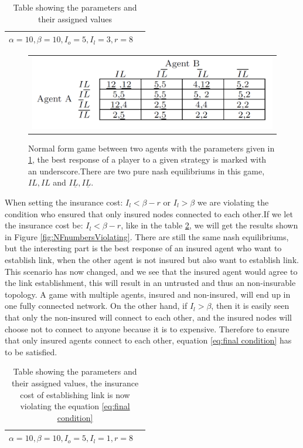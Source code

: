 \begin{table}[h]
\centering
\begin{tabular}{lc}
 \hline
  $\alpha=10,
  \beta=10,
  I_{o}=5,
  I_{l}=3,
  r=8$\\
  \hline
\end{tabular}
\caption{Table showing the parameters and their assigned values \label{tbl:simplegamevalue}}
\end{table}

\begin{figure}[h]
\centering
\begin{tabular}{@{}c@{}}
\includegraphics[width=1.0\textwidth]{../Figures/gameTheoryModel1WithNumbers.png}
\end{tabular}
\caption[Caption for LOF]{Normal form game between two agents with the parameters given in \ref{tbl:simplegamevalue}, the best response of a player to a given strategy is marked with an underscore.There are two pure nash equilibriums in this game,$IL,IL$ and $I\underline{L},I\underline{L}$. \label{fig:NFnumbers}}
\end{figure}
When setting the insurance cost: $I_{l}<\beta - r$ or $I_{l}>\beta$ we are violating the condition who ensured that only insured nodes connected to each other.If we let the insurance cost be: $I_{l}<\beta - r$, like in the table \ref{tbl:simplegamevalue2}, we will get the results shown in Figure \ref{fig:NFnumbersViolating}. There are still the same nash equilibriums, but the interesting part is the best response of an insured agent who want to establish link, when the other agent is not insured but also want to establish link. This scenario has now changed, and we see that the insured agent would agree to the link establishment, this will result in an untrusted and thus an non-insurable topology. A game with multiple agents, insured and non-insured, will end up in one fully connected network.
On the other hand, if $I_{l}>\beta$, then it is easily seen that only the non-insured will connect to each other, and the insured nodes will choose not to connect to anyone because it is to expensive.
 Therefore to ensure that only insured agents connect to each other, equation \ref{eq:final condition} has to be satisfied. 
\begin{table}[h]
\centering
\begin{tabular}{lc}
 \hline
  $\alpha=10,
  \beta=10,
  I_{o}=5,
  I_{l}=1,
  r=8$\\
  \hline
\end{tabular}
\caption{Table showing the parameters and their assigned values, the insurance cost of establishing link is now violating the equation \ref{eq:final condition} \label{tbl:simplegamevalue2}}
\end{table}

